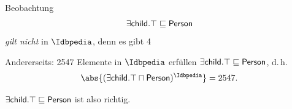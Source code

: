 \documentclass[ngerman]{beamer}
\begin{document}
\begin{frame}
  

  \begin{block}{Beobachtung}
    \begin{equation*}
      \sf \exists child. \top \sqsubseteq Person
    \end{equation*}
    \emph{gilt nicht} in $\Idbpedia$, denn es gibt 4 
    \begin{overlayarea}{\textwidth}{5ex}
    \end{overlayarea}


    \bigskip{}

    Andererseits: 2547 Elemente in $\Idbpedia$ erfüllen $\sf \exists child. \top
    \sqsubseteq \sf Person$, d.\,h.
    \begin{equation*}
      \abs{ (\sf \exists child.\top \sqcap Person)^{\Idbpedia} } = 2547.
    \end{equation*}


    $\sf \exists child. \top \sqsubseteq Person$ ist also
     richtig.
  \end{block}

\end{frame}
\end{document}
